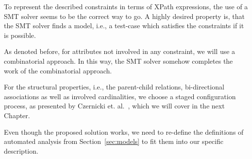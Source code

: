To represent the described constraints in terms of XPath expressions, the use of a SMT solver seems to be the correct way to go. A highly desired property is, that the SMT solver finds a model, i.e., a test-case which satisfies the constraints if it is possible.

As denoted before, for attributes not involved in any constraint, we will use a combinatorial approach. In this way, the SMT solver somehow completes the work of the combinatorial approach. 

For the structural properties, i.e., the parent-child relations, bi-directional associations as well as involved cardinalities, we choose a staged configuration process, as presented by Czernicki et. al.~\cite{card-based-feature-models-formalization}, which we will cover in the next Chapter.

Even though the proposed solution works, we need to re-define the definitions of automated analysis from Section~\ref{sec:models} to fit them into our specific description.


